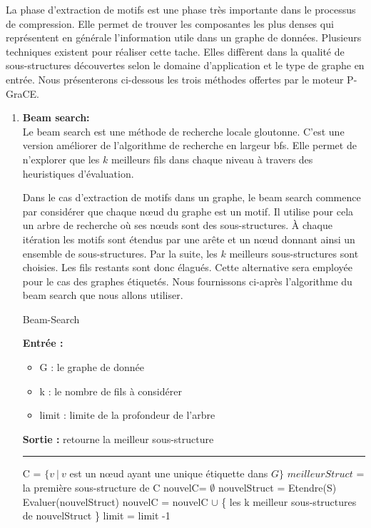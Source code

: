\documentclass[a4paper,oneside,12pt]{report}
\theoremstyle{definition}
\begin{document}
La phase d'extraction de motifs est une phase très importante	 dans le processus de compression. Elle permet de trouver les composantes les plus denses qui représentent en générale l'information utile dans un graphe de données. Plusieurs techniques existent pour réaliser cette tache. Elles diffèrent dans la qualité de sous-structures découvertes selon le domaine d'application et le type de graphe en entrée. Nous présenterons ci-dessous les trois méthodes offertes par le moteur P-GraCE.
		
\begin{enumerate}

\item \textbf{Beam search:}\\

Le beam search est une méthode de recherche locale gloutonne. C'est une version améliorer de l'algorithme de recherche en largeur \gls{bfs}. Elle permet de n'explorer que les $k$ meilleurs fils dans chaque niveau à travers des heuristiques d'évaluation.

Dans le cas d'extraction de motifs dans un graphe, le beam search commence par considérer que chaque nœud du graphe est un motif. Il utilise pour cela un arbre de recherche où ses nœuds sont des sous-structures. À chaque itération les motifs sont étendus par une arête et un nœud donnant ainsi un ensemble de sous-structures. Par la suite, les $k$ meilleurs sous-structures sont choisies. Les fils restants sont donc élagués. %
Cette alternative sera employée pour le cas des graphes étiquetés. Nous fournissons ci-après l'algorithme du beam search que nous allons utiliser. 


\begin{algorithm}[H]
					\label{alg:beamSearch}
					\caption{Beam-Search}
					\textbf{Entrée :}
						\begin{itemize}[label=$\bullet$]
							\item G : le graphe de donnée
							\item k : le nombre de fils à considérer
							\item limit : limite de la profondeur de l'arbre
						\end{itemize}
					\textbf{Sortie :} retourne la meilleur sous-structure\\							\noindent\rule{\textwidth}{1pt}
						
						
				\begin{algorithmic} [1]
					\STATE C = $\{v\ |\ v$ est un nœud ayant une unique étiquette dans  $G\}$
					\STATE $meilleurStruct$ = la première sous-structure de C
					\REPEAT
					\STATE nouvelC= $\emptyset$
						\STATE nouvelStruct = Etendre(S)
						\STATE Evaluer(nouvelStruct)
						\STATE nouvelC = nouvelC $\cup$ \{ les k meilleur sous-structures de nouvelStruct \}
					\ENDFOR
					\STATE limit = limit -1
					

\end{algorithmic}
\end{algorithm}
\end{enumerate}
\end{document}
